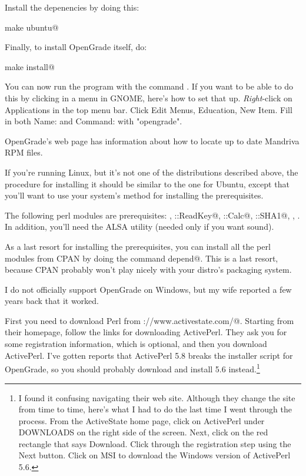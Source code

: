 \documentclass{opengrade_doc}
\begin{document}
Install the depenencies by doing this:

\verb@sudo make ubuntu@

Finally, to install OpenGrade itself, do:

\verb@sudo make install@

You can now run the program with the command \verb@opengrade@. If you want to be able to do this
by clicking in a menu in GNOME, here's how to set that up. \emph{Right}-click on Applications in the top
menu bar. Click Edit Menus, Education, New Item. Fill in both Name: and Command: with "opengrade".


OpenGrade's web page has information about how to locate up to date Mandriva RPM files.


If you're running Linux, but it's not one of the distributions described above,
the procedure for installing it should be similar to the one for Ubuntu, except that you'll want
to use your system's method for installing
the prerequisites.

The following perl modules are prerequisites:
\verb@Clone@,
\verb@Term::ReadKey@,
\verb@Date::Calc@,
\verb@Digest::SHA1@,
\verb@JSON@,
\verb@Tk@.
In addition, you'll need the ALSA \verb@aplay@ utility (needed only if you want sound).

As a last resort for installing the prerequisites, you can install all the perl modules from CPAN
by doing the command \verb@make depend@. This is a last resort, because CPAN probably won't play
nicely with your distro's packaging system.

I do not officially support OpenGrade on Windows, but my wife reported a few years back that it worked.

First you need to download Perl from \verb@http://www.activestate.com/@.
Starting from their homepage, follow the links for downloading ActivePerl.
They ask you for some registration information, which is optional, and then you download
ActivePerl. I've gotten reports that ActivePerl 5.8 breaks the installer
script for OpenGrade, so you should probably download and install 5.6
instead.\footnote{I found it confusing navigating their web site. Although
they change the site from time to time, here's what I had to do the last time
I went through the process. From the ActiveState home page, click on ActivePerl
under DOWNLOADS on the right side of the screen. Next, click on the red rectangle
that says Download. Click through the registration step using the Next button. Click
on MSI to download the Windows version of ActivePerl 5.6.}
\end{document}
